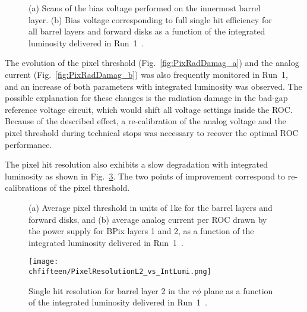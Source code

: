 \begin{figure}[!htb]
 \begin{center}
 \end{center}
 \caption{(a) Scans of the bias voltage performed on the innermost barrel layer. (b) Bias voltage corresponding to full single hit efficiency for all barrel layers and forward disks as a function of the integrated luminosity delivered in Run~1~\cite{PixelOffline}.}
 \label{fig:PixBiasV}
\end{figure}

The evolution of the pixel threshold (Fig.~\ref{fig:PixRadDamag_a}) and the analog current (Fig.~\ref{fig:PixRadDamag_b}) was also frequently monitored in Run~1,
and an increase of both parameters with integrated luminosity was observed.
The possible explanation for these changes is the radiation damage in the bad-gap reference voltage circuit, which would shift all voltage settings inside the ROC.
Because of the described effect, a re-calibration of the analog voltage and the pixel threshold during technical stops was necessary to recover the optimal ROC performance.

The pixel hit resolution also exhibits a slow degradation with integrated luminosity as shown in Fig.~\ref{fig:PixRelvsLumi}. The two points of improvement correspond to re-calibrations of the pixel threshold.

\begin{figure}[!htb]
 \begin{center}
 \end{center}
 \caption{(a) Average pixel threshold in units of 1\unit{ke} for the barrel layers and forward disks, and (b) average analog current per ROC drawn by the power supply for BPix layers 1 and 2, as a function of the integrated luminosity delivered in Run~1~\cite{PixelOffline}.}
 \label{fig:PixRadDamag}
\end{figure}

\begin{figure}[!htb]
 \begin{center}
 \texttt{[image: \\chfifteen/PixelResolutionL2\_vs\_IntLumi.png]}
 \end{center}
 \caption{Single hit resolution for barrel layer 2 in the $r\phi$ plane as a function of the integrated luminosity delivered in Run~1~\cite{PixelOffline}.}
 \label{fig:PixRelvsLumi}
\end{figure}

